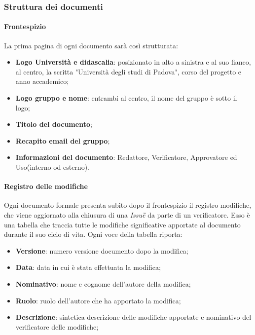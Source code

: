 	\subsubsection{Struttura dei documenti}
		\paragraph*{Frontespizio}
		\aCapo{}    
			La prima pagina di ogni documento sarà così strutturata:
				\begin{itemize}
					\item \textbf{Logo Università e didascalia}: posizionato in alto a sinistra e al suo fianco, al centro, la scritta "Università degli studi di Padova", corso del progetto e anno accademico;
					\item \textbf{Logo gruppo e nome}: entrambi al centro, il nome del gruppo è sotto il logo;
					\item \textbf{Titolo del documento};
					\item \textbf{Recapito email del gruppo};
					\item \textbf{Informazioni del documento}: Redattore, Verificatore, Approvatore ed Uso(interno od esterno).
				\end{itemize}
			
		\paragraph*{Registro delle modifiche}
		\aCapo{}  
			Ogni documento formale presenta subito dopo il frontespizio il registro modifiche, che viene aggiornato alla chiusura di una \textit{Issue\G{}} da parte di un verificatore.
			Esso è una tabella che traccia tutte le modifiche significative apportate al documento durante il suo ciclo di vita. Ogni voce della tabella riporta:
				\begin{itemize}
					\item \textbf{Versione}: numero versione documento dopo la modifica;
					\item \textbf{Data}: data in cui è stata effettuata la modifica;
					\item \textbf{Nominativo}: nome e cognome dell'autore della modifica;
					\item \textbf{Ruolo}: ruolo dell'autore che ha apportato la modifica;
					\item \textbf{Descrizione}: sintetica descrizione delle modifiche apportate e nominativo del verificatore delle modifiche;
				\end{itemize}
	
